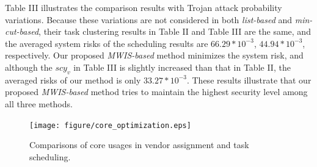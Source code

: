 \documentclass[10pt,journal]{IEEEtran}
\begin{document}
Table III illustrates the comparison results with Trojan attack probability variations. Because these variations are not considered in both \textit{list-based} and \textit{min-cut-based}, their task clustering results in Table II and Table III are the same, and the averaged system risks of the scheduling results are $66.29*10^{-3}$, $44.94*10^{-3}$, respectively. Our proposed \textit{MWIS-based} method minimizes the system risk, and although the $scy_v$ in Table III is slightly increased than that in Table II, the averaged risks of our method is only $33.27*10^{-3}$. These results illustrate that our proposed \textit{MWIS-based} method tries to maintain the highest security level among all three methods.


\begin{figure}[!t]
\centering
\hspace*{-1.2em}
\texttt{[image: figure/core\_optimization.eps]}
\caption{Comparisons of core usages in vendor assignment and task scheduling.}
\label{fig:core_optimization}
\end{figure}
\end{document}
